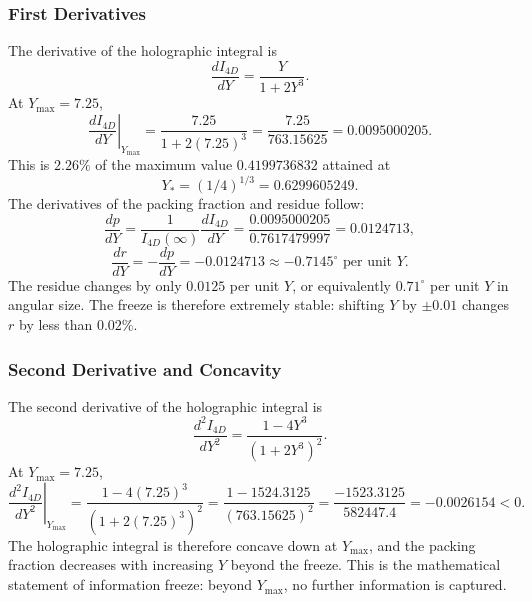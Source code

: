 \documentclass[12pt,oneside,openany]{book}
\begin{document}
\subsubsection{First Derivatives}

The derivative of the holographic integral is
\begin{equation}
\frac{dI_{4D}}{dY} = \frac{Y}{1 + 2Y^3}.
\label{eq:dI4D-dY}
\end{equation}
At $Y_{\max} = 7.25$,
\begin{equation}
\left.\frac{dI_{4D}}{dY}\right|_{Y_{\max}} = \frac{7.25}{1 + 2(7.25)^3} = \frac{7.25}{763.15625} = 0.0095000205.
\label{eq:dI4D-dY-Ymax}
\end{equation}
This is $2.26\%$ of the maximum value $0.4199736832$ attained at
\begin{equation}
Y_* = (1/4)^{1/3} = 0.6299605249.
\label{eq:Ystar}
\end{equation}
The derivatives of the packing fraction and residue follow:
\begin{equation}
\frac{dp}{dY} = \frac{1}{I_{4D}(\infty)} \frac{dI_{4D}}{dY} = \frac{0.0095000205}{0.7617479997} = 0.0124713,
\label{eq:dp-dY}
\end{equation}
\begin{equation}
\boxed{\frac{dr}{dY} = -\frac{dp}{dY} = -0.0124713 \approx -0.7145^\circ \text{ per unit } Y.}
\label{eq:dr-dY}
\end{equation}
The residue changes by only $0.0125$ per unit $Y$, or equivalently $0.71^\circ$ per unit $Y$ in angular size. The freeze is therefore extremely stable: shifting $Y$ by $\pm 0.01$ changes $r$ by less than $0.02\%$.

\subsubsection{Second Derivative and Concavity}

The second derivative of the holographic integral is
\begin{equation}
\frac{d^2I_{4D}}{dY^2} = \frac{1 - 4Y^3}{(1 + 2Y^3)^2}.
\label{eq:d2I4D-dY2}
\end{equation}
At $Y_{\max} = 7.25$,
\begin{equation}
\left.\frac{d^2I_{4D}}{dY^2}\right|_{Y_{\max}} = \frac{1 - 4(7.25)^3}{(1 + 2(7.25)^3)^2} = \frac{1 - 1524.3125}{(763.15625)^2} = \frac{-1523.3125}{582447.4} = -0.0026154 < 0.
\label{eq:d2I4D-dY2-Ymax}
\end{equation}
The holographic integral is therefore concave down at $Y_{\max}$, and the packing fraction decreases with increasing $Y$ beyond the freeze. This is the mathematical statement of information freeze: beyond $Y_{\max}$, no further information is captured.
\end{document}
